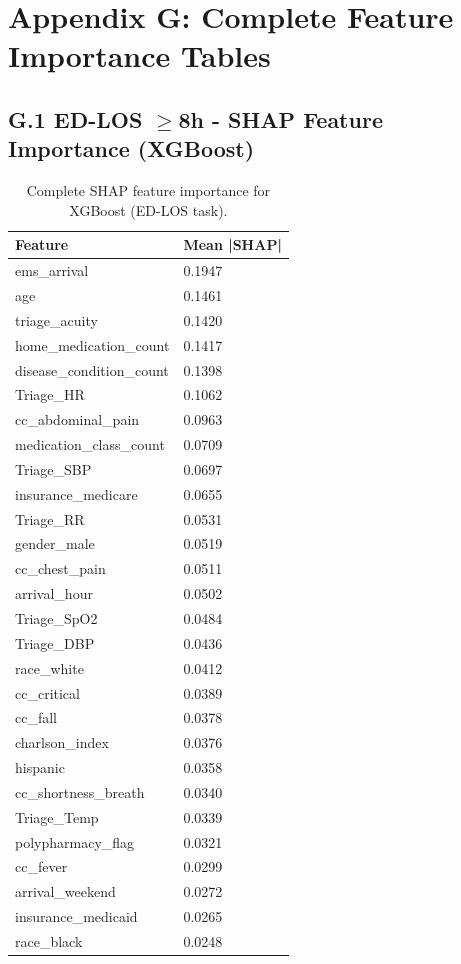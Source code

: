 \documentclass[11pt]{article}
\begin{document}
\section{Appendix G: Complete Feature Importance Tables}

\subsection{G.1 ED-LOS $\ge$8h - SHAP Feature Importance (XGBoost)}

\begin{table}[H]
\centering
\caption{Complete SHAP feature importance for XGBoost (ED-LOS task).}
\begin{tabular}{@{}ll@{}}
\toprule
\textbf{Feature} & \textbf{Mean |SHAP|} \\
\midrule
ems\_arrival & 0.1947 \\
age & 0.1461 \\
triage\_acuity & 0.1420 \\
home\_medication\_count & 0.1417 \\
disease\_condition\_count & 0.1398 \\
Triage\_HR & 0.1062 \\
cc\_abdominal\_pain & 0.0963 \\
medication\_class\_count & 0.0709 \\
Triage\_SBP & 0.0697 \\
insurance\_medicare & 0.0655 \\
Triage\_RR & 0.0531 \\
gender\_male & 0.0519 \\
cc\_chest\_pain & 0.0511 \\
arrival\_hour & 0.0502 \\
Triage\_SpO2 & 0.0484 \\
Triage\_DBP & 0.0436 \\
race\_white & 0.0412 \\
cc\_critical & 0.0389 \\
cc\_fall & 0.0378 \\
charlson\_index & 0.0376 \\
hispanic & 0.0358 \\
cc\_shortness\_breath & 0.0340 \\
Triage\_Temp & 0.0339 \\
polypharmacy\_flag & 0.0321 \\
cc\_fever & 0.0299 \\
arrival\_weekend & 0.0272 \\
insurance\_medicaid & 0.0265 \\
race\_black & 0.0248 \\
\bottomrule
\end{tabular}
\end{table}
\end{document}

